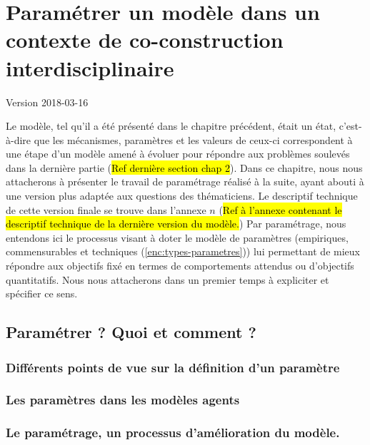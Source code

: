 \documentclass[12pt, a4paper, oneside]{book}
\begin{document}
	\setcounter{part}{0}
	\setcounter{chapter}{2}
	\setcounter{secnumdepth}{3}
		
	\chapter{Paramétrer un modèle dans un contexte de co-construction interdisciplinaire}
	\begin{center}
		{\large Version 2018-03-16}
	\end{center}

	Le modèle, tel qu'il a été présenté dans le chapitre précédent, était un \og état\fg{}, c'est-à-dire que les mécanismes, paramètres et les valeurs de ceux-ci correspondent à une étape d'un modèle amené à évoluer pour répondre aux problèmes soulevés dans la dernière partie (\hl{Ref dernière section chap 2}).
	Dans ce chapitre, nous nous attacherons à présenter le travail de paramétrage réalisé à la suite, ayant abouti à une version plus adaptée aux questions des thématiciens. Le descriptif technique de cette version \og finale\fg{} se trouve dans l'annexe $n$ (\hl{Ref à l'annexe contenant le descriptif technique de la dernière version du modèle.})
	Par paramétrage, nous entendons ici le processus visant à doter le modèle de paramètres (empiriques, \og commensurables\fg{} et techniques (\cref{enc:types-parametres})) lui permettant de mieux répondre aux objectifs fixé en termes de comportements attendus ou d'objectifs quantitatifs. Nous nous attacherons dans un premier temps à expliciter et spécifier ce sens.
	

%	
	\section{Paramétrer ? Quoi et comment ?}
	\subsection{Différents points de vue sur la définition d'un paramètre}
	\subsection{Les paramètres dans les modèles agents}
	\subsection{Le paramétrage, un processus d'amélioration du modèle.}
\end{document}
